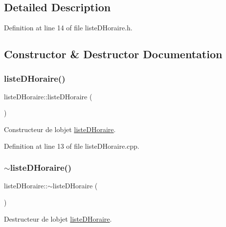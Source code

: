 \subsection{Detailed Description}


Definition at line 14 of file liste\+D\+Horaire.\+h.



\subsection{Constructor \& Destructor Documentation}
\hypertarget{classliste_d_horaire_a614fd89aa8fb95f9068613fc1974f307}{}\label{classliste_d_horaire_a614fd89aa8fb95f9068613fc1974f307} 
\subsubsection{\texorpdfstring{liste\+D\+Horaire()}{listeDHoraire()}}
{\footnotesize\ttfamily liste\+D\+Horaire\+::liste\+D\+Horaire (\begin{DoxyParamCaption}{ }\end{DoxyParamCaption})}



Constructeur de l\textquotesingle{}objet \hyperlink{classliste_d_horaire}{liste\+D\+Horaire}. 



Definition at line 13 of file liste\+D\+Horaire.\+cpp.

\hypertarget{classliste_d_horaire_a497a28a7b80534317d7ec387d4c8714b}{}\label{classliste_d_horaire_a497a28a7b80534317d7ec387d4c8714b} 
\subsubsection{\texorpdfstring{$\sim$liste\+D\+Horaire()}{~listeDHoraire()}}
{\footnotesize\ttfamily liste\+D\+Horaire\+::$\sim$liste\+D\+Horaire (\begin{DoxyParamCaption}{ }\end{DoxyParamCaption})}



Destructeur de l\textquotesingle{}objet \hyperlink{classliste_d_horaire}{liste\+D\+Horaire}. 



